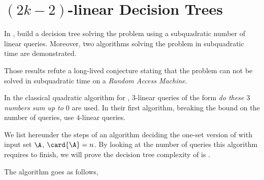 \section{$(2k-2)$-linear Decision Trees}

In \cite{gronlund:2014}, \citeauthor{gronlund:2014} build a decision tree
solving the \threeSUM problem using
a subquadratic number of linear queries. Moreover, two algorithms
solving the \threeSUM problem in subquadratic time are demonstrated.

Those results refute a long-lived conjecture stating that the \threeSUM problem
can not be solved in subquadratic time on a \emph{Random Access Machine}.

In the classical quadratic algorithm for \threeSUM, $3$-linear queries of the
form \emph{do these $3$ numbers sum up to $0$} are used. In their first
algorithm, breaking the  bound on the number of queries,
\citeauthor{gronlund:2014} use $4$-linear queries.

We list hereunder the steps of an algorithm deciding the one-set
version of \threeSUM with input set $\A$, $\card{\A} = n$. By looking at the
number of queries this algorithm requires to finish, we will prove the
decision tree complexity of \threeSUM is .

The algorithm goes as follows,

